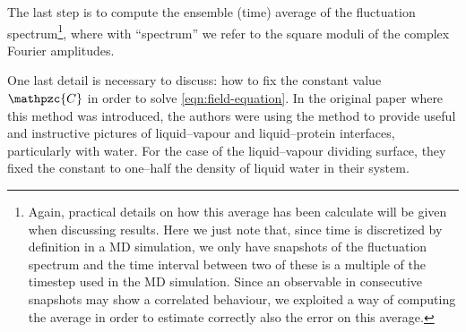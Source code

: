 The last step is to compute the ensemble (time) average of the fluctuation spectrum\footnote{Again, practical details on how this average has been calculate will be given when discussing results. Here we just note that, since time is discretized by definition in a MD simulation, we only have snapshots of the fluctuation spectrum and the time interval between two of these is a multiple of the timestep used in the MD simulation. Since an observable in consecutive snapshots may show a correlated behaviour, we exploited a way of computing the average in order to estimate correctly also the error on this average.}, where with ``spectrum'' we refer to the square moduli of the complex Fourier amplitudes. %

One last detail is necessary to discuss: how to fix the constant value $\mathpzc{C}$ in order to solve \cref{eqn:field-equation}. In the original paper where this method was introduced, the authors were using the method to provide useful and instructive pictures of liquid--vapour and liquid--protein interfaces, particularly with water. For the case of the liquid--vapour dividing surface, they fixed the constant to one--half the density of liquid water in their system. %

